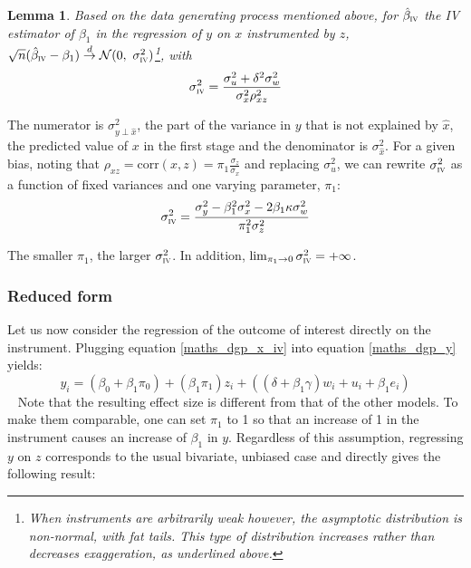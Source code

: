 \documentclass[usletter, 12pt]{article}
\newtheorem{lemma}{Lemma}
\begin{document}
			\begin{lemma}\label{lemma_iv}
				Based on the data generating process mentioned above, for $\hat{\beta}_{\textsc{iv}}$ the IV estimator of $\beta_{1}$ in the regression of $y$ on $x$ instrumented by $z$,  $\sqrt{n} ( \hat{\beta}_{\textsc{iv}} - \beta_{1} ) \overset{d}{\to} \mathcal{N}(0, \ \sigma_{\textsc{iv}}^{2})$\footnote{When instruments are arbitrarily weak however, the asymptotic distribution is non-normal, with fat tails. This type of distribution increases rather than decreases exaggeration, as underlined above.}, with
					\[
						\sigma_{\textsc{iv}}^{2} = \dfrac{\sigma_{u}^{2} + \delta^{2}\sigma_{w}^{2}}{ \sigma_{x}^{2} \rho_{xz}^{2}}
					\]
			\end{lemma}
			
			The numerator is $\sigma_{y \perp \hat{x}}^{2}$, the part of the variance in $y$ that is not explained by $\hat{x}$, the predicted value of $x$ in the first stage and the denominator is $\sigma_{\hat{x}}^{2}$. For a given bias, noting that $\rho_{xz} = \text{corr}(x, z) = \pi_1 \frac{\sigma_z}{\sigma_x}$ and replacing $\sigma_{u}^{2}$, we can rewrite $\sigma_{\textsc{iv}}^{2}$ as a function of fixed variances and one varying parameter, $\pi_{1}$:
			\[
				\sigma_{\textsc{iv}}^{2} = \dfrac{\sigma_{y}^{2} - \beta_{1}^{2}\sigma_{x}^{2} - 2\beta_{1}\kappa \sigma_{w}^{2}}{\pi_{1}^{2} \sigma_{z}^{2}}
			\]
			
			The smaller $\pi_{1}$, the larger $\sigma_{\textsc{iv}}^{2}$. In addition, $\lim_{\pi_{1}\to 0} \sigma_{\textsc{iv}}^{2} = + \infty$.
			

				 

		\subsubsection{Reduced form}
		
			Let us now consider the regression of the outcome of interest directly on the instrument. Plugging equation \ref{maths_dgp_x_iv} into equation \ref{maths_dgp_y} yields:			
				\[
					y_{i} = (\beta_{0} + \beta_{1}\pi_0) + (\beta_{1}\pi_{1}) z_{i} + ((\delta + \beta_{1}\gamma) w_{i} + u_{i} + \beta_{1}e_{i})
				\]
				~
				Note that the resulting effect size is different from that of the other models. To make them comparable, one can set $\pi_{1}$ to 1 so that an increase of 1 in the instrument causes an increase of $\beta_{1}$ in $y$. Regardless of this assumption, regressing $y$ on $z$ corresponds to the usual bivariate, unbiased case and directly gives the following result:
				
\end{document}
